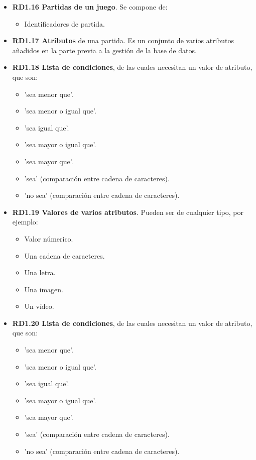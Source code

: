 \begin{itemize}
	\item \textbf{RD1.16 Partidas de un juego}. Se compone de:
	\begin{itemize}
		\item Identificadores de partida.
	\end{itemize}
	
	\item \textbf{RD1.17 Atributos} de una partida. Es un conjunto de varios atributos añadidos en la parte previa a la gestión de la base de datos.
	
	\item \textbf{RD1.18 Lista de condiciones}, de las cuales necesitan un valor de atributo, que son:
	\begin{itemize}
		\item 'sea menor que'.
		\item 'sea menor o igual que'.
		\item 'sea igual que'.
		\item 'sea mayor o igual que'.
		\item 'sea mayor que'.
		\item 'sea' (comparación entre cadena de caracteres).
		\item 'no sea' (comparación entre cadena de caracteres).
	\end{itemize}
	
	\item \textbf{RD1.19 Valores de varios atributos}. Pueden ser de cualquier tipo, por ejemplo:
	\begin{itemize}
		\item Valor númerico.
		\item Una cadena de caracteres.
		\item Una letra.
		\item Una imagen.
		\item Un vídeo.
	\end{itemize}
	
	\item \textbf{RD1.20 Lista de condiciones}, de las cuales necesitan un valor de atributo, que son:
	\begin{itemize}
		\item 'sea menor que'.
		\item 'sea menor o igual que'.
		\item 'sea igual que'.
		\item 'sea mayor o igual que'.
		\item 'sea mayor que'.
		\item 'sea' (comparación entre cadena de caracteres).
		\item 'no sea' (comparación entre cadena de caracteres).
	\end{itemize}
	

\end{itemize}
